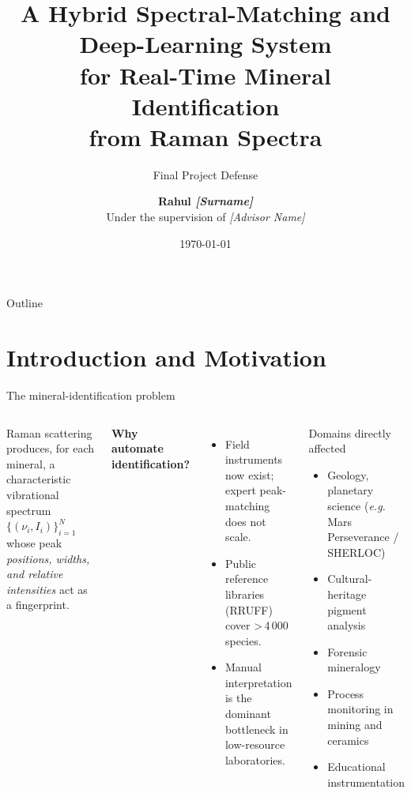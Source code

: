 \documentclass[10pt,aspectratio=169,xcolor=dvipsnames]{beamer}
\title[Raman-AI: Mineral Identification from Raman Spectra]{\textbf{A Hybrid Spectral-Matching and Deep-Learning System\\[0.18em]
        for Real-Time Mineral Identification\\[0.18em] from Raman Spectra}}
\subtitle{Final Project Defense}
\author[Rahul]{\textbf{Rahul \textit{[Surname]}}\\[0.3em]
        \small Under the supervision of \textit{[Advisor Name]}}
\institute{Department of \textit{[Discipline]}\\
           \textit{[Institution Name]}}
\date{\today}
\begin{document}

\maketitle

\begin{frame}{Outline}
  \tableofcontents[hideallsubsections]
\end{frame}

\section{Introduction and Motivation}

\begin{frame}{The mineral-identification problem}
  \begin{columns}[T,onlytextwidth]
      Raman scattering produces, for each mineral, a characteristic
      vibrational spectrum
      $\{(\nu_i, I_i)\}_{i=1}^{N}$ whose peak \emph{positions, widths,
      and relative intensities} act as a fingerprint.
      \medskip

      \textbf{Why automate identification?}
      \begin{itemize}
        \item Field instruments now exist; expert peak-matching does not scale.
        \item Public reference libraries (RRUFF) cover \textgreater\,4\,000 species.
        \item Manual interpretation is the dominant bottleneck in
              low-resource laboratories.
      \end{itemize}

      \begin{block}{Domains directly affected}
        \begin{itemize}\setlength\itemsep{0.2em}
          \item Geology, planetary science (\emph{e.g.\ } Mars
                Perseverance / SHERLOC)
          \item Cultural-heritage pigment analysis
          \item Forensic mineralogy
          \item Process monitoring in mining and ceramics
          \item Educational instrumentation
        \end{itemize}
      \end{block}
  \end{columns}
\end{frame}
\end{document}
